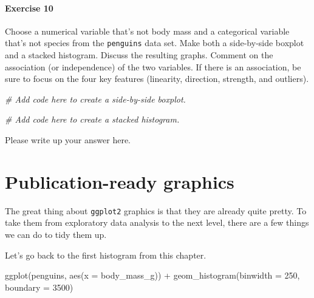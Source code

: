 \documentclass[
]{book}
\newenvironment{Shaded}{\begin{snugshade}}{\end{snugshade}}
\newcommand{\AttributeTok}[1]{\textcolor[rgb]{0.77,0.63,0.00}{#1}}
\newcommand{\CommentTok}[1]{\textcolor[rgb]{0.56,0.35,0.01}{\textit{#1}}}
\newcommand{\DecValTok}[1]{\textcolor[rgb]{0.00,0.00,0.81}{#1}}
\newcommand{\FunctionTok}[1]{\textcolor[rgb]{0.00,0.00,0.00}{#1}}
\newcommand{\NormalTok}[1]{#1}
\newcommand{\SpecialCharTok}[1]{\textcolor[rgb]{0.00,0.00,0.00}{#1}}
\begin{document}
\hypertarget{exercise-10}{%
\paragraph*{Exercise 10}\label{exercise-10}}

Choose a numerical variable that's not body mass and a categorical variable that's not species from the \texttt{penguins} data set. Make both a side-by-side boxplot and a stacked histogram. Discuss the resulting graphs. Comment on the association (or independence) of the two variables. If there is an association, be sure to focus on the four key features (linearity, direction, strength, and outliers).

\begin{Shaded}
\begin{Highlighting}[]
\CommentTok{\# Add code here to create a side{-}by{-}side boxplot.}
\end{Highlighting}
\end{Shaded}

\begin{Shaded}
\begin{Highlighting}[]
\CommentTok{\# Add code here to create a stacked histogram.}
\end{Highlighting}
\end{Shaded}

Please write up your answer here.

\hypertarget{numerical-pub}{%
\section{Publication-ready graphics}\label{numerical-pub}}

The great thing about \texttt{ggplot2} graphics is that they are already quite pretty. To take them from exploratory data analysis to the next level, there are a few things we can do to tidy them up.

Let's go back to the first histogram from this chapter.

\begin{Shaded}
\begin{Highlighting}[]
\FunctionTok{ggplot}\NormalTok{(penguins, }\FunctionTok{aes}\NormalTok{(}\AttributeTok{x =}\NormalTok{ body\_mass\_g)) }\SpecialCharTok{+}
    \FunctionTok{geom\_histogram}\NormalTok{(}\AttributeTok{binwidth =} \DecValTok{250}\NormalTok{, }\AttributeTok{boundary =} \DecValTok{3500}\NormalTok{)}
\end{Highlighting}
\end{Shaded}
\end{document}
